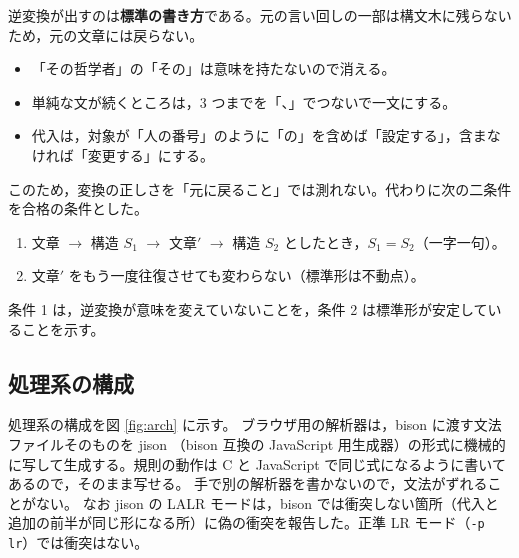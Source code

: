 \documentclass[a4paper,10pt]{ltjsarticle}
\begin{document}
逆変換が出すのは\textbf{標準の書き方}である。元の言い回しの一部は構文木に残らないため，元の文章には戻らない。
\begin{itemize}
\item 「その哲学者」の「その」は意味を持たないので消える。
\item 単純な文が続くところは，3 つまでを「、」でつないで一文にする。
\item 代入は，対象が「人の番号」のように「の」を含めば「設定する」，含まなければ「変更する」にする。
\end{itemize}
このため，変換の正しさを「元に戻ること」では測れない。代わりに次の二条件を合格の条件とした。
\begin{enumerate}
\item 文章 $\to$ 構造 $S_1$ $\to$ 文章$'$ $\to$ 構造 $S_2$ としたとき，$S_1 = S_2$（一字一句）。
\item 文章$'$ をもう一度往復させても変わらない（標準形は不動点）。
\end{enumerate}
条件 1 は，逆変換が意味を変えていないことを，条件 2 は標準形が安定していることを示す。

\subsection{処理系の構成}

処理系の構成を図 \ref{fig:arch} に示す。
ブラウザ用の解析器は，bison に渡す文法ファイルそのものを jison \cite{jison}（bison 互換の JavaScript 用生成器）の形式に機械的に写して生成する。規則の動作は C と JavaScript で同じ式になるように書いてあるので，そのまま写せる。
手で別の解析器を書かないので，文法がずれることがない。
なお jison の LALR モードは，bison では衝突しない箇所（代入と追加の前半が同じ形になる所）に偽の衝突を報告した。正準 LR モード（\verb|-p lr|）では衝突はない。
\end{document}
